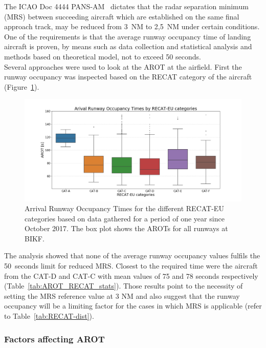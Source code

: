 The ICAO Doc 4444 PANS-AM~\cite{doc44444} dictates that the radar separation minimum (MRS) between succeeding aircraft which are established on the same final approach track, may be reduced from 3~NM to 2,5~NM under certain conditions. One of the requirements is that the average runway occupancy time of landing aircraft is proven, by means such as data collection and statistical analysis and methods based on theoretical model, not to exceed 50 seconds. \\
Several approaches were used to look at the AROT at the airfield. First the runway occupancy was inspected based on the RECAT category of the aircraft (Figure~\ref{fig:RECAT_AROTs_boxplot}). 
\begin{figure}[h]
    \centering
    \includegraphics[width=1\textwidth]{graphics/fig_RECAT_AROTs_boxplot.png}
    \caption[AROTs boxplot for RECAT categories, all runways]{Arrival Runway Occupancy Times for the different RECAT-EU categories based on data gathered for a period of one year since October 2017. The box plot shows the AROTs for all runways at BIKF.}
    \label{fig:RECAT_AROTs_boxplot}
\end{figure}
The analysis showed that none of the average runway occupancy values fulfils the 50~seconds limit for reduced MRS. Closest to the required time were the aircraft from the CAT-D and CAT-C with mean values of 75 and 78 seconds respectively (Table~\ref{tab:AROT_RECAT_stats}). Those results point to the necessity of setting the MRS reference value at 3 NM and also suggest that the runway occupancy will be a limiting factor for the cases in which MRS is applicable (refer to Table~\ref{tab:RECAT-dist}).


\subsubsection{Factors affecting AROT\label{sssec:factors_arot}}







